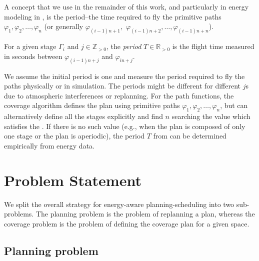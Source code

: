 A concept that we use in the remainder of this work, and particularly in energy modeling in , is the period--the time required to fly the primitive paths $\varphi_1,\varphi_2,\dots,\varphi_n$ (or generally $\varphi_{(i-1)n+1},$ $\varphi_{(i-1)n+2},\dots,\varphi_{(i-1)n+n}$). 

\begin{defn}[Period]
  \label{def:period}
  For a given stage $\Gamma_i$ and $j\in\mathbb{Z}_{>0}$, the \emph{period} $T\in\mathbb{R}_{> 0}$ is the flight time measured in seconds between $\varphi_{(i-1)n+j}$ and $\varphi_{in+j}$.
\end{defn} 
  
We assume the initial period is one and measure the period required to fly the paths physically or in simulation. The periods might be different for different $j$s due to atmospheric interferences or replanning. For the path functions, the coverage algorithm defines the plan using primitive paths $\varphi_1,\varphi_2,\dots,\varphi_n$, but can alternatively define all the stages explicitly and find $n$ searching the value which satisfies the . If there is no such value (e.g., when the plan is composed of only one stage or the plan is aperiodic), the period $T$ from  can be determined empirically from energy data.


\section{Problem Statement}
\label{sec:2pbs}

We split the overall strategy for energy-aware planning-scheduling into two sub-problems. The planning problem is the problem of replanning a plan, whereas the coverage problem is the problem of defining the coverage plan for a given space.  

\subsection{Planning problem}
\label{sec:plan-pb}

